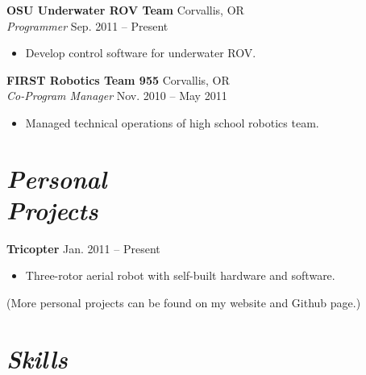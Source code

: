 \documentclass[10pt,letterpaper,margin]{res}
\begin{document}
\begin{resume}
{\bf OSU Underwater ROV Team} \hfill {\color{lightgray} Corvallis, OR} \\
{\it Programmer} \hfill {\color{lightgray} Sep. 2011 -- Present}\vspace{0.2em}

\begin{itemize}
	\item Develop control software for underwater ROV.
\end{itemize}


{\bf FIRST Robotics Team 955} \hfill {\color{lightgray} Corvallis, OR} \\
{\it Co-Program Manager} \hfill {\color{lightgray} Nov. 2010 -- May 2011}\vspace{0.2em}

\begin{itemize}
	\item Managed technical operations of high school robotics team.
\end{itemize}



\section{\large\itshape Personal \\ Projects}

{\bf Tricopter} \hfill {\color{lightgray} Jan. 2011 -- Present}\vspace{0.2em}

\begin{itemize}
	\item Three-rotor aerial robot with self-built hardware and software.
\end{itemize}

{\footnotesize (More personal projects can be found on my website and Github page.)}



\section{\large\itshape Skills}


\end{resume}
\end{document}

